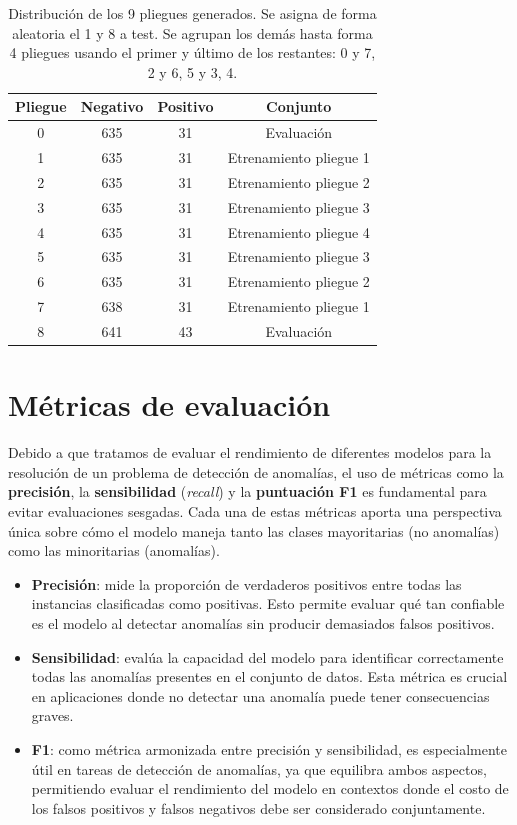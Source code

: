 \documentclass[12pt,letterpaper]{article}
\begin{document}
\begin{table}[htp]
    \centering
    \begin{tabular}{cccc}
    \hline
    \textbf{Pliegue} & \textbf{Negativo} & \textbf{Positivo} & \textbf{Conjunto}\\ \hline
        0 & 635 & 31 & Evaluación \\ 
        1 & 635 & 31 & Etrenamiento pliegue 1 \\ 
        2 & 635 & 31 & Etrenamiento pliegue 2\\ 
        3 & 635 & 31 & Etrenamiento pliegue 3\\ 
        4 & 635 & 31 & Etrenamiento pliegue 4\\ 
        5 & 635 & 31 & Etrenamiento pliegue 3\\ 
        6 & 635 & 31 & Etrenamiento pliegue 2 \\
        7 & 638 & 31 & Etrenamiento pliegue 1\\ 
        8 & 641 & 43 & Evaluación \\ \hline
    \end{tabular}
    \caption{Distribución de los 9 pliegues generados. Se asigna de forma aleatoria el 1 y 8 a test. Se agrupan los demás hasta forma 4 pliegues usando el primer y último de los restantes: 0 y 7, 2 y 6, 5 y 3, 4.}
    \label{tab:ValidacionCruzada}
\end{table}

\section{Métricas de evaluación}\label{sec:Metricas}

Debido a que tratamos de evaluar el rendimiento de diferentes modelos para la resolución de un problema de detección de anomalías, 
el uso de métricas como la \textbf{precisión}, la \textbf{sensibilidad} (\textit{recall}) y la \textbf{puntuación F1} es fundamental para evitar evaluaciones sesgadas. 
Cada una de estas métricas aporta una perspectiva única sobre cómo el modelo maneja tanto las clases mayoritarias (no anomalías) como las minoritarias (anomalías).

\begin{itemize}
    \item \textbf{Precisión}: mide la proporción de verdaderos positivos entre todas las instancias clasificadas como positivas. Esto permite evaluar qué tan confiable es el modelo al detectar anomalías sin producir demasiados falsos positivos.
    \item \textbf{Sensibilidad}: evalúa la capacidad del modelo para identificar correctamente todas las anomalías presentes en el conjunto de datos. Esta métrica es crucial en aplicaciones donde no detectar una anomalía puede tener consecuencias graves.
    \item \textbf{F1}: como métrica armonizada entre precisión y sensibilidad, es especialmente útil en tareas de detección de anomalías, ya que equilibra ambos aspectos, permitiendo evaluar el rendimiento del modelo en contextos donde el costo de los falsos positivos y falsos negativos debe ser considerado conjuntamente.
\end{itemize}
\end{document}
